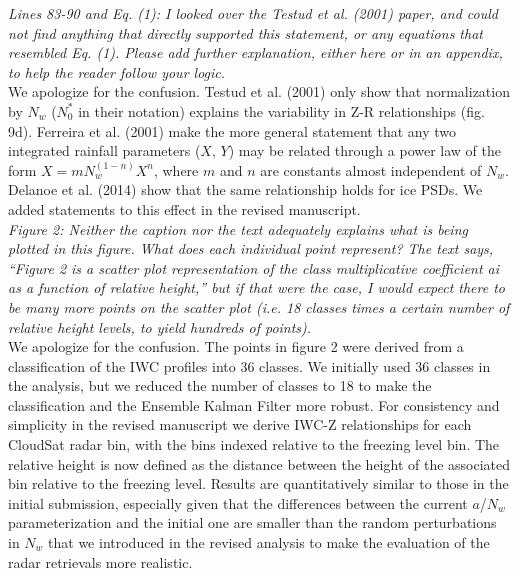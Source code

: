 \documentclass[12pt]{article}
\begin{document}
\newline
\textit{Lines 83-90 and Eq. (1): I looked over the Testud et al. (2001) paper, and could not find anything that directly
 supported this statement, or any equations that resembled Eq. (1). Please add further explanation, either here 
 or in an appendix, to help the reader follow your logic.}\\
\newline
We apologize for the confusion. Testud et al. (2001) only show that normalization by $N_w$ ($N_0^*$ in their notation) explains the variability
in Z-R relationships (fig. 9d). Ferreira et al. (2001) \cite{ferreira2001} make the more general statement that any two integrated rainfall parameters ($X$, $Y$) 
may be related through a power law of the form $X = m N_w^{(1-n)} X^n$, where $m$ and $n$ are constants almost independent of $N_w$. Delanoe et al. (2014)
 \cite{delanoe2014} show that the same relationship holds for ice PSDs. We added statements to this effect in the revised manuscript.\\
\newline
\textit{Figure 2: Neither the caption nor the text adequately explains what is being plotted in this figure. What does each 
individual point represent? The text says, “Figure 2 is a scatter plot representation of the class multiplicative 
coefficient ai as a function of relative height,” but if that were the case, I would expect there to be many more 
points on the scatter plot (i.e. 18 classes times a certain number of relative height levels, to yield hundreds of points).}\\
\newline
We apologize for the confusion.  The points in figure 2 were derived from a classification of the IWC profiles into 36 classes.  
We initially used 36 classes in the analysis, but
we reduced the number of classes to 18 to make the classification and the Ensemble Kalman Filter more robust.  
For consistency and simplicity in the revised manuscript we derive IWC-Z relationships 
for each CloudSat radar bin, with the bins indexed relative to the freezing level bin.  The relative height is now defined as the distance
between the height of the associated bin relative to the freezing level.  Results are quantitatively similar to those in the initial
submission, especially given that the differences between the current $a$/$N_w$ parameterization and the initial one are smaller than 
the random perturbations in $N_w$ that we introduced in the revised analysis to make the evaluation of the radar retrievals more realistic.\\
\end{document}
